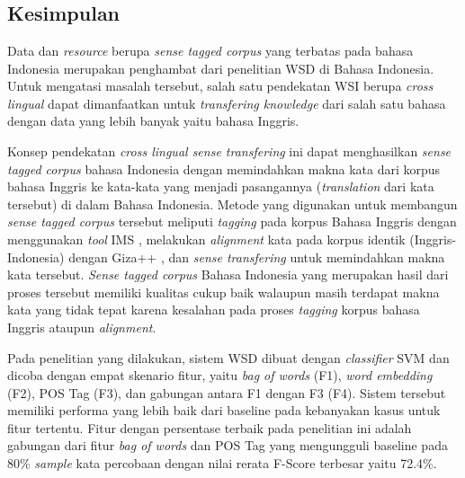 \chapter{\babEnam}

\section{Kesimpulan}

Data dan \textit{resource} berupa \textit{sense tagged corpus} yang terbatas pada bahasa Indonesia merupakan penghambat dari penelitian WSD di Bahasa Indonesia. Untuk mengatasi masalah tersebut, salah satu pendekatan WSI berupa \textit{cross lingual} dapat dimanfaatkan untuk \textit{transfering knowledge} dari salah satu bahasa dengan data yang lebih banyak yaitu bahasa Inggris.

Konsep pendekatan \textit{cross lingual sense transfering} ini dapat menghasilkan \textit{sense tagged corpus} bahasa Indonesia dengan memindahkan makna kata dari korpus bahasa Inggris ke kata-kata yang menjadi pasangannya (\textit{translation} dari kata tersebut) di dalam Bahasa Indonesia. Metode yang digunakan untuk membangun \textit{sense tagged corpus} tersebut meliputi \textit{tagging} pada korpus Bahasa Inggris dengan menggunakan \textit{tool} IMS \citep{zhong2010makes}, melakukan \textit{alignment} kata pada korpus identik (Inggris-Indonesia) dengan Giza++ \citep{och03:asc}, dan \textit{sense transfering} untuk memindahkan makna kata tersebut. \textit{Sense tagged corpus} Bahasa Indonesia  yang merupakan hasil dari proses tersebut memiliki kualitas cukup baik walaupun masih terdapat makna kata yang tidak tepat karena kesalahan pada proses \textit{tagging} korpus bahasa Inggris ataupun \textit{alignment}.

Pada penelitian yang dilakukan, sistem WSD dibuat dengan \textit{classifier} SVM dan dicoba dengan empat skenario fitur, yaitu \textit{bag of words} (F1), \textit{word embedding} (F2), POS Tag (F3), dan gabungan antara F1 dengan F3 (F4). Sistem tersebut  memiliki performa yang lebih baik dari baseline pada kebanyakan kasus untuk fitur tertentu. Fitur dengan persentase terbaik pada penelitian ini adalah gabungan dari fitur \textit{bag of words} dan POS Tag yang mengungguli baseline pada 80\% \textit{sample} kata percobaan dengan nilai rerata F-Score terbesar yaitu 72.4\%.
